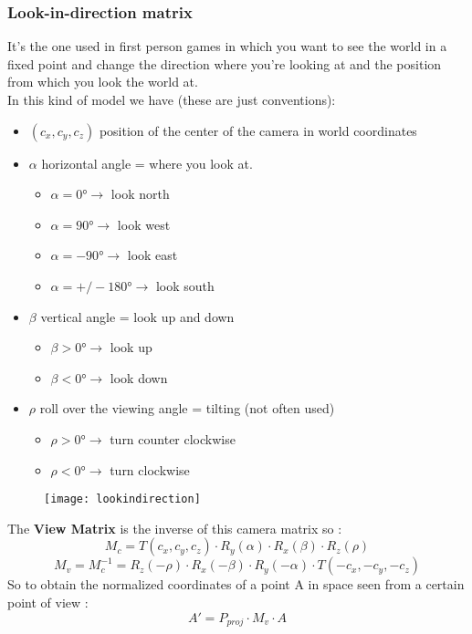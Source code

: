 \subsubsection{Look-in-direction matrix}
It's the one used in first person games in which you want to see the world in a fixed point and change the direction where you're looking at and the position from which you look the world at.\\
In this kind of model we have (these are just conventions):
\begin{itemize}
\item $(c_x,c_y,c_z) $ position of the center of the camera in world coordinates
\item $\alpha$ horizontal angle = where you look at.
\begin{itemize}
\item $\alpha = \ang{0}  \to$ look north
\item $\alpha = \ang{90} \to$ look west
\item $\alpha = \ang{-90} \to $ look east
\item $\alpha =  +/- \ang{180} \to$ look south
\end{itemize}
\item $\beta $ vertical angle = look up and down
\begin{itemize}
\item $\beta > \ang{0}  \to$ look up
\item $\beta < \ang{0}  \to$ look down
\end{itemize}
\item $\rho$ roll over the viewing angle  = tilting (not often used)
\begin{itemize}
\item $\rho > \ang{0}  \to$ turn counter clockwise
\item $\rho < \ang{0}  \to$ turn clockwise
\end{itemize}
\end{itemize}
\begin{figure}[H]
  \centering
  \texttt{[image: lookindirection]}
\end{figure}
The \textbf{View Matrix} is the inverse of this camera matrix so :
$$ M_c = T(c_x,c_y,c_z) \cdot R_y(\alpha) \cdot R_x(\beta) \cdot R_z(\rho)$$
$$ M_v= M_c^{-1} = R_z(-\rho)\cdot R_x(-\beta) \cdot R_y(-\alpha) \cdot T(-c_x,-c_y,-c_z)$$
So to obtain the normalized coordinates of a point A in space seen from a certain point of view :
$$ A'=P_{proj} \cdot M_v \cdot A$$

